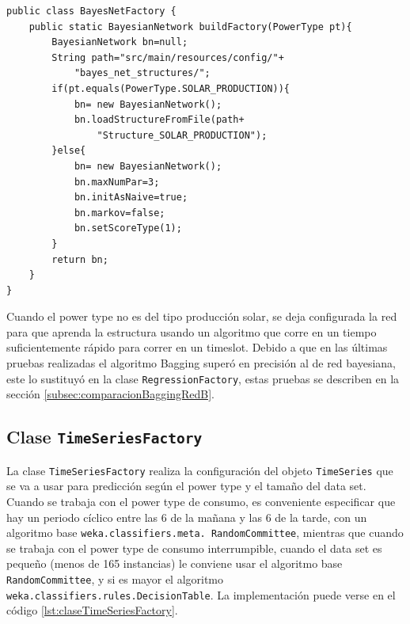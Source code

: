 
\begin{lstlisting}[frame=single]  
public class BayesNetFactory {
	public static BayesianNetwork buildFactory(PowerType pt){
		BayesianNetwork bn=null;
		String path="src/main/resources/config/"+
			"bayes_net_structures/";
		if(pt.equals(PowerType.SOLAR_PRODUCTION)){
			bn= new BayesianNetwork();
			bn.loadStructureFromFile(path+
				"Structure_SOLAR_PRODUCTION");
		}else{
			bn= new BayesianNetwork(); 
			bn.maxNumPar=3;
			bn.initAsNaive=true;
			bn.markov=false;
			bn.setScoreType(1);
		}
		return bn;
	}
}
\end{lstlisting}
Cuando el power type no es del tipo producción solar, se deja configurada la red para que aprenda la estructura usando un algoritmo que corre en un tiempo suficientemente rápido para correr en un timeslot. Debido a que en las últimas pruebas realizadas el algoritmo Bagging superó en precisión al de red bayesiana, este lo sustituyó en la clase \texttt{RegressionFactory}, estas pruebas se describen en la sección \ref{subsec:comparacionBaggingRedB}.

\subsection{Clase \texttt{TimeSeriesFactory}} \label{subsec:claseTimeSeriesFactory}
La clase \texttt{TimeSeriesFactory} realiza la configuración del objeto \texttt{TimeSeries} que se va a usar para predicción según el power type y el tamaño del data set. Cuando se trabaja con el power type de consumo, es conveniente especificar que hay un periodo cíclico entre las 6 de la mañana y las 6 de la tarde, con un algoritmo base \texttt{weka.classifiers.meta. RandomCommittee}, mientras que cuando se trabaja con el power type de consumo interrumpible, cuando el data set es pequeño (menos de 165 instancias) le conviene usar el algoritmo base \texttt{RandomCommittee}, y si es mayor el algoritmo \texttt{weka.classifiers.rules.DecisionTable}. La implementación puede verse en el código \ref{lst:claseTimeSeriesFactory}.



